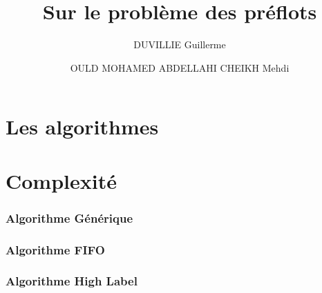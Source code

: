 

\author{DUVILLIE Guillerme \and OULD MOHAMED ABDELLAHI CHEIKH Mehdi}
\title{Sur le problème des préflots}



\maketitle
\newpage

\tableofcontents
\newpage



\part{Les algorithmes}


\part{Complexité}
\section{Algorithme Générique}


\section{Algorithme FIFO}


\section{Algorithme High Label}






